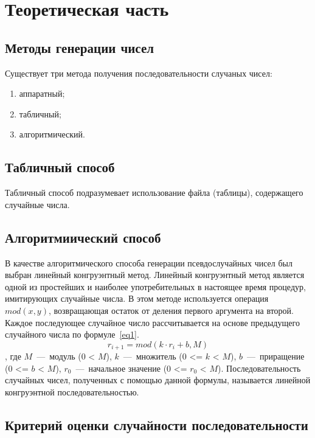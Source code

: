 \chapter{Теоретическая часть}

\section{Методы генерации чисел}

Существует три метода получения последовательности случаных чисел:
\begin{enumerate}
	\item аппаратный;
	\item табличный;
	\item алгоритмический. 
\end{enumerate}

\section{Табличный способ}

Табличный способ подразумевает использование файла (таблицы), содержащего случайные числа.

\section{Алгоритмиический способ}

В качестве алгоритмического способа генерации псевдослучайных чисел был выбран линейный конгруэнтный метод.
Линейный конгруэнтный метод является одной из простейших и наиболее употребительных в настоящее время процедур, имитирующих случайные числа.
В этом методе используется операция $mod(x, y)$, возвращающая остаток от деления первого аргумента на второй.
Каждое последующее случайное число рассчитывается на основе предыдущего случайного числа по формуле~\ref{eq1}.
\begin{equation}
	\label{eq1}
	r_{i+1} = mod(k · r_i + b, M)
\end{equation}
, где $M$~---~модуль (0 < $M$),
$k$~---~множитель (0 <= $k$ < $M$),
$b$~---~приращение (0 <= $b$ < $M$),
$r_0$~---~начальное значение (0 <= $r_0$ < $M$).
Последовательность случайных чисел, полученных с помощью данной формулы, называется линейной конгруэнтной последовательностью.

\newpage

\section{Критерий оценки случайности последовательности}

